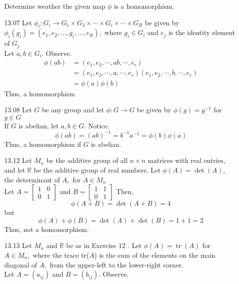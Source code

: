 \documentclass[12pt]{article}
\newcommand{\R}{\mathbb{R}}
\begin{document}
\begin{enumerate}
	\item[]Determine weather the given map $ \phi $ is a homomorphism. 
	\item[13.07] Let $ \phi _ { i } : G _ { i } \rightarrow G _ { 1 } \times G _ { 2 } \times \cdots \times G _ { i } \times \cdots \times G _ R $ be given by $ \phi _ { i } \left( g _ { i } \right) = \left( e _ { 1 } , e _ { 2 } , \ldots , g _ { i } , \ldots , e _ R \right) ,$ where $ g _ { i } \in G_i $ and $e _ { j } $ is the identity element of $G _ { j }$\\
	Let $ a,b\in G_i $. Observe. 
	\begin{align*}
		\phi(ab) &= (e_1, e_2,\cdots,ab,\cdots , e_r)\\
				 &= (e_1, e_2, \cdots,a,\cdots,e_r)(e_1, e_2,\cdots,b,\cdots, e_r)\\
				 &= \phi(a)\phi(b)
	\end{align*}
	Thus, a homomorphism
	\item[13.08] Let $ G $  be any group and let $ \phi : G \rightarrow G $  be given by $ \phi ( g ) = g ^ { - 1}$ for $g \in G $\\
	If $ G $ is abelian, let $ a,b\in G $. Notice.
	\[\phi(ab)=(ab)^{-1}=b^{-1}a^{-1}=\phi(b)\phi(a)\]
	Thus, a homomorphism if $ G $ is abelian.
	\item[13.12] Let $ M _ { n } $  be the additive group of all $ n \times n $  matrices with real entries, and let $ \R $  be the additive group of real numbers. Let $ \phi ( A ) = \operatorname { det } ( A ) , $  the determinant of $A , $  for $ A \in M _ { n }$\\
	Let $ A = \begin{bmatrix}
		1 & 0 \\
		0 & 1
		\end{bmatrix} $ and $ B = \begin{bmatrix}
			1 & 1 \\
			0 & 1
		\end{bmatrix} $ Then,
		\[\phi(A+B)=\det(A+B)=4\] but
		\[\phi(A)+\phi(B)=\det(A)+\det(B)= 1+1=2\]
		Thus, not a homomorphism.
	\item[13.13]Let $ M _ { n } $ and $ \R $ be as in Exercise 12 . Let $ \phi ( A ) = \operatorname { tr } ( A ) $ for $ A \in M _ { n } , $ where the trace tr($A$) is the sum of the elements on the main diagonal of $ A , $ from the upper-left to the lower-right corner.\\
	Let $ A = (a_{ij}) $ and $ B = (b_{ij})  $. Observe.
	\begin{align*}

\end{align*}
\end{enumerate}
\end{document}
